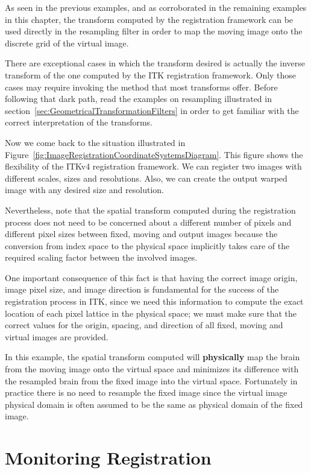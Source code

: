 As seen in the previous examples, and as corroborated in the remaining
examples in this chapter, the transform computed by the registration
framework can be used directly in the resampling filter in order to
map the moving image onto the discrete grid of the virtual image.

There are exceptional cases in which the transform desired is actually
the inverse transform of the one computed by the ITK registration framework.
Only those cases may require invoking the 
method that most transforms offer. Before following that dark path,
read the examples on resampling illustrated in
section~\ref{sec:GeometricalTransformationFilters} in order to get
familiar with the correct interpretation of the transforms.

Now we come back to the situation illustrated in
Figure~\ref{fig:ImageRegistrationCoordinateSystemsDiagram}. This figure shows
the flexibility of the ITKv4 registration framework. We can register two
images with different scales, sizes and resolutions. Also, we can create the
output warped image with any desired size and resolution.

Nevertheless, note that the spatial transform computed during the
registration process does not need to be concerned about a different number
of pixels and different pixel sizes between fixed, moving and output images
because the conversion from index space to the physical space implicitly
takes care of the required scaling factor between the involved images.

One important consequence of this fact is that having the correct image origin,
image pixel size, and image direction is fundamental for the success of the
registration process in ITK, since we need this information to compute the exact
location of each pixel lattice in the physical space; we must make sure
that the correct values for the origin, spacing, and direction of all
fixed, moving and virtual images are provided.

In this example, the spatial transform computed will \textbf{physically} map
the brain from the moving image onto the virtual space and minimizes its
difference with the resampled brain from the fixed image into the virtual
space. Fortunately in practice there is no need to resample the fixed image
since the virtual image physical domain is often assumed to be the same as
physical domain of the fixed image.

\section{Monitoring Registration}
\label{sec:MonitoringImageRegistration}
\ifitkFullVersion

\fi



